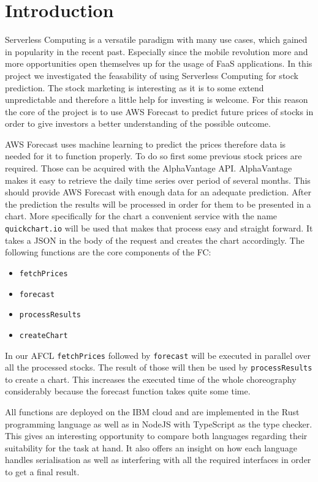 %
%
%
\chapter{\label{chap:introduction}Introduction}

Serverless Computing is a versatile paradigm with many use cases, which gained
in popularity in the recent past.  Especially since the mobile revolution more
and more opportunities open themselves up for the usage of FaaS applications.  In
this project we investigated the feasability of using Serverless Computing for
stock prediction. The stock marketing is interesting as it is to some extend
unpredictable and therefore a little help for investing is welcome. For this
reason the core of the project is to use AWS Forecast to predict future prices
of stocks in order to give investors a better understanding of the possible
outcome.

AWS Forecast uses machine learning to predict the prices therefore data is
needed for it to function properly. To do so first some previous stock prices
are required. Those can be acquired with the AlphaVantage API.
AlphaVantage makes it easy to retrieve the daily time series over period of
several months. This should provide AWS Forecast with enough data for an
adequate prediction. After the prediction the results will be processed in
order for them to be presented in a chart. More specifically for the chart a
convenient service with the name \texttt{quickchart.io} will be used that
makes that process easy and straight forward. It takes a JSON in the
body of the request and creates the chart accordingly. The following functions
are the core components of the FC:

\begin{itemize}
  \item \texttt{fetchPrices}
  \item \texttt{forecast}
  \item \texttt{processResults}
  \item \texttt{createChart}
\end{itemize}

In our AFCL \texttt{fetchPrices} followed by \texttt{forecast} will be executed
in parallel over all the processed stocks. The result of those will then be
used by \texttt{processResults} to create a chart. This increases the executed
time of the whole choreography considerably because the forecast function takes
quite some time.

All functions are deployed on the IBM cloud and are
implemented in the Rust programming language as well as in
NodeJS with TypeScript as the type checker. This gives an
interesting opportunity to compare both languages regarding their suitability
for the task at hand. It also offers an insight on how each language handles
serialisation as well as interfering with all the required interfaces in order
to get a final result.

